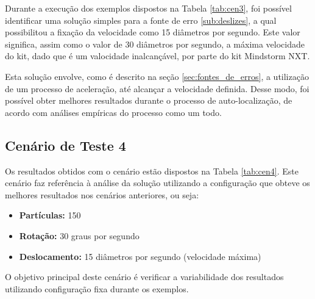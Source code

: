 Durante a execução dos exemplos dispostos na Tabela \ref{tab:cen3}, foi possível identificar uma solução simples para a fonte de erro
\ref{sub:deslizes}, a qual possibilitou a fixação da velocidade como 15 diâmetros por segundo. Este valor significa, assim como o valor de 30 diâmetros por segundo, a máxima
velocidade do kit, dado que é um valocidade inalcançável, por parte do kit Mindstorm NXT.

Esta solução envolve, como é descrito na seção \ref{sec:fontes_de_erros}, a utilização de um processo de aceleração, até alcançar a velocidade
definida. Desse modo, foi possível obter melhores resultados durante o processo de auto-localização, de acordo com análises empíricas do
processo como um todo.

\subsection{Cenário de Teste 4}
\label{sub:cen4}

Os resultados obtidos com o cenário estão dispostos na Tabela \ref{tab:cen4}. Este cenário faz referência à análise da solução
utilizando a configuração que obteve os melhores resultados nos cenários anteriores, ou seja:

\begin{itemize}
  \item \textbf{Partículas:} 150
  \item \textbf{Rotação:} 30 graus por segundo
  \item \textbf{Deslocamento:} 15 diâmetros por segundo (velocidade máxima)
\end{itemize}

O objetivo principal deste cenário é verificar a variabilidade dos resultados utilizando configuração fixa durante os exemplos.

